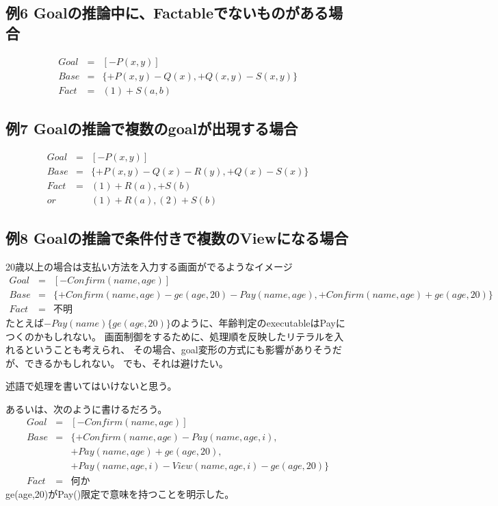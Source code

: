 \documentclass[10pt, onecolumn]{jarticle}   	%
\begin{document}
\subsection{例6 Goalの推論中に、Factableでないものがある場合}
\begin{eqnarray*}
Goal &=& [-P(x,y)] \\
Base &=& \{+P(x,y)-Q(x), +Q(x,y)-S(x,y)\} \\
Fact &=&(1) +S(a,b)
\end{eqnarray*}

\subsection{例7 Goalの推論で複数のgoalが出現する場合}
\begin{eqnarray*}
Goal &=& [-P(x,y)] \\
Base &=& \{+P(x,y)-Q(x)-R(y), +Q(x)-S(x)\} \\
Fact &=&(1) +R(a), +S(b) \\
or 
& & (1) +R(a), (2) +S(b)
\end{eqnarray*}

\subsection{例8 Goalの推論で条件付きで複数のViewになる場合}
20歳以上の場合は支払い方法を入力する画面がでるようなイメージ
\begin{eqnarray*}
Goal &=& [-Confirm(name, age)] \\
Base &=& \{+Confirm(name, age)-ge(age,20)-Pay(name,age),
+Confirm(name, age) +ge(age,20)\} \\
Fact &=& 不明
\end{eqnarray*}
たとえば$-Pay(name)\{ge(age,20)\}$のように、年齢判定のexecutableはPayにつくのかもしれない。
画面制御をするために、処理順を反映したリテラルを入れるということも考えられ、
その場合、goal変形の方式にも影響がありそうだが、できるかもしれない。
でも、それは避けたい。

述語で処理を書いてはいけないと思う。

あるいは、次のように書けるだろう。
\begin{eqnarray*}
Goal &=& [-Confirm(name, age)] \\
Base &=& \{+Confirm(name, age)-Pay(name,age,i),\\
&&+Pay(name, age) +ge(age,20), \\
&&+Pay(name,age,i) -View(name,age,i) -ge(age,20)\} \\
Fact &=& 何か
\end{eqnarray*}
ge(age,20)がPay()限定で意味を持つことを明示した。
\end{document}
